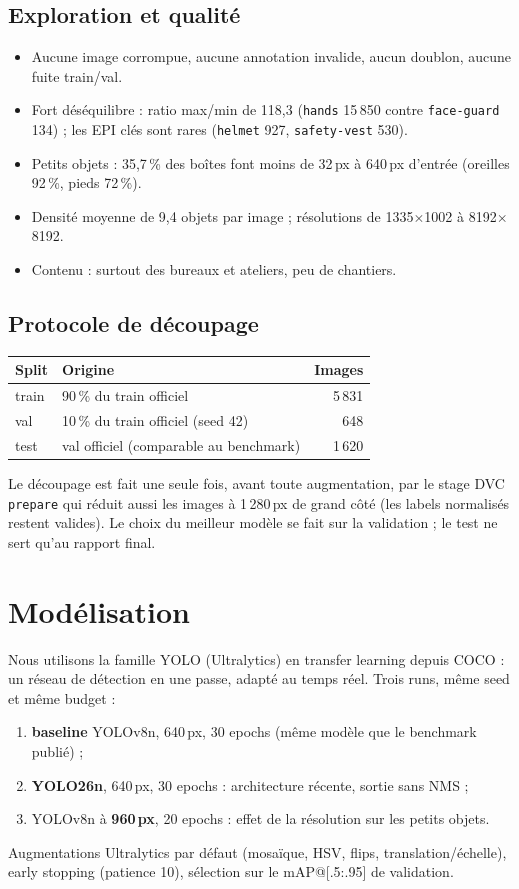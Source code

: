 \documentclass[11pt,a4paper]{article}
\begin{document}
\subsection{Exploration et qualité}
\begin{itemize}
  \item Aucune image corrompue, aucune annotation invalide, aucun doublon, aucune fuite train/val.
  \item Fort déséquilibre : ratio max/min de 118,3 (\texttt{hands} 15\,850 contre \texttt{face-guard} 134) ;
        les EPI clés sont rares (\texttt{helmet} 927, \texttt{safety-vest} 530).
  \item Petits objets : 35,7\,\% des boîtes font moins de 32\,px à 640\,px d'entrée (oreilles 92\,\%, pieds 72\,\%).
  \item Densité moyenne de 9,4 objets par image ; résolutions de 1335$\times$1002 à 8192$\times$8192.
  \item Contenu : surtout des bureaux et ateliers, peu de chantiers.
\end{itemize}

\subsection{Protocole de découpage}
\begin{table}[H]\centering
\begin{tabular}{llr}\toprule
Split & Origine & Images\\\midrule
train & 90\,\% du train officiel & 5\,831\\
val & 10\,\% du train officiel (seed 42) & 648\\
test & val officiel (comparable au benchmark) & 1\,620\\\bottomrule
\end{tabular}\end{table}
Le découpage est fait une seule fois, avant toute augmentation, par le stage DVC \texttt{prepare}
qui réduit aussi les images à 1\,280\,px de grand côté (les labels normalisés restent valides).
Le choix du meilleur modèle se fait sur la validation ; le test ne sert qu'au rapport final.

\section{Modélisation}
Nous utilisons la famille YOLO (Ultralytics) en transfer learning depuis COCO : un réseau de
détection en une passe, adapté au temps réel. Trois runs, même seed et même budget :
\begin{enumerate}
  \item \textbf{baseline} YOLOv8n, 640\,px, 30 epochs (même modèle que le benchmark publié) ;
  \item \textbf{YOLO26n}, 640\,px, 30 epochs : architecture récente, sortie sans NMS ;
  \item YOLOv8n à \textbf{960\,px}, 20 epochs : effet de la résolution sur les petits objets.
\end{enumerate}
Augmentations Ultralytics par défaut (mosaïque, HSV, flips, translation/échelle), early stopping
(patience 10), sélection sur le mAP@[.5:.95] de validation.
\end{document}
